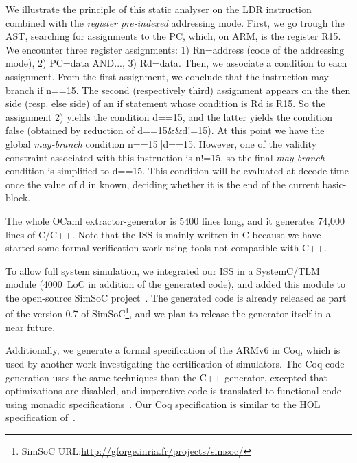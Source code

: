 \documentclass[conference]{ieeeconf}
\begin{document}
We illustrate the principle of this static analyser on the {\stt LDR}
instruction combined with the {\em register pre-indexed} addressing mode. First,
we go trough the AST, searching for assignments to the PC, which, on ARM, is the
register {\stt R15}. We encounter three register assignments: 1) {\stt
  Rn=address} (code of the addressing mode), 2) {\stt PC=data AND...}, 3) {\stt
  Rd=data}. Then, we associate a condition to each assignment. From the first
assignment, we conclude that the instruction may branch if {\stt n==15}. The
second (respectively third) assignment appears on the {\stt then} side (resp.
{\stt else} side) of an {\stt if} statement whose condition is {\stt Rd is R15}.
So the assignment 2) yields the condition {\stt d==15}, and the latter yields
the condition {\stt false} (obtained by reduction of {\stt d==15\&\&d!=15}). At
this point we have the global {\em may-branch} condition {\stt
  n==15||d==15}. However, one of the validity constraint associated with this
instruction is {\stt n!=15}, so the final {\em may-branch} condition is
simplified to {\stt d==15}. This condition will be evaluated at decode-time once
the value of {\stt d} in known, deciding whether it is the end of the current
basic-block.



The whole OCaml extractor-generator is 5400
lines long, and it generates 74,000 lines of C/C++. Note that the ISS
is mainly written in C because we have started some formal
verification work using tools not compatible with C++.

To allow full system simulation, we integrated our ISS in a SystemC/TLM module
(4000~LoC in addition of the generated code), and added this module to the
open-source SimSoC project~\cite{ossc09}. The generated code is already released
as part of the version 0.7 of
SimSoC\footnote{SimSoC URL:\url{http://gforge.inria.fr/projects/simsoc/}}, and
we plan to release the generator itself in a near future.


Additionally, we generate a formal specification of the ARMv6 in Coq, which is
used by another work investigating the certification of simulators. The Coq code
generation uses the same techniques than the C++ generator, excepted that
optimizations are disabled, and imperative code is translated to functional code
using monadic specifications~\cite{wadjfp09}. Our Coq specification is similar
to the HOL specification of~\cite{FoxM10}.
\end{document}
